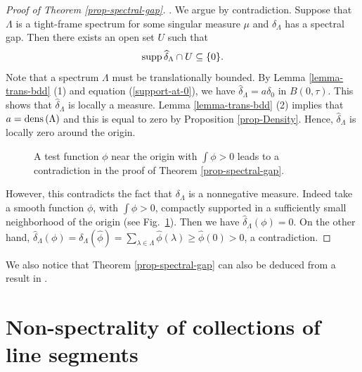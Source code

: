 \documentclass[12pt,a4paper,oneside]{amsart}
\theoremstyle{definition}
\newcommand{\Set}[1]{{\left\{{#1}\right\}}}
\newcommand{\dens}{{\rm dens\,}}
\newcommand{\supp}{{\rm supp\,}}
\newcommand{\ft}[1]{\widehat{#1}}
\newcounter{rem}
\begin{document}
 \begin{proof} [Proof of Theorem \ref{prop-spectral-gap}].
     We argue by contradiction. Suppose that $\Lambda$ is a {tight-frame} spectrum for some singular measure $\mu$ and $\delta_{\Lambda}$ has a spectral gap. Then there exists an open set $U$ such that \begin{equation}\label{support-at-0}
\supp\ft\delta_\Lambda \cap U \subseteq \Set{0}.
\end{equation}
     Note that a spectrum $\Lambda$ must be translationally bounded. By Lemma \ref{lemma-trans-bdd} (1) and equation (\ref{support-at-0}), we have $\ft\delta_{\Lambda} = a\delta_0$ in $B(0,\tau)$. This shows that $\ft\delta_{\Lambda} $ is locally a measure. Lemma \ref{lemma-trans-bdd} (2) implies that $a = \dens(\Lambda)$ and this is equal to zero by Proposition \ref{prop-Density}. Hence, $\ft\delta_{\Lambda} $ is locally zero around the origin. 

\begin{figure}[h]
\ifdefined\SMART\resizebox{4cm}{!}{}\else

\fi
\caption{A test function $\phi$ near the origin with $\int\phi>0$ leads to a contradiction in the proof of Theorem \ref{prop-spectral-gap}.}\label{fig:test-function}
\end{figure}

     However, this contradicts the fact that $\delta_\Lambda$ is a nonnegative measure. Indeed take a smooth function $\phi$, with $\int\phi>0$, compactly supported in a sufficiently small neighborhood of the origin (see Fig.\ \ref{fig:test-function}). Then we  have $\ft\delta_\Lambda(\phi)=0$. On the other hand, $\ft\delta_\Lambda(\phi) = \delta_\Lambda(\ft\phi) = \sum_{\lambda\in\Lambda}\ft\phi(\lambda) \ge \ft\phi(0) > 0$, a contradiction.
\end{proof}

     We also notice that Theorem \ref{prop-spectral-gap} can also be deduced from a result in \cite[Proposition 4]{LO15}. 







\section{Non-spectrality of {collections of} line segments}\label{s:line}
\end{document}
